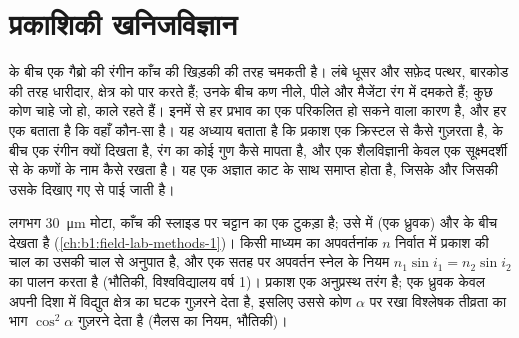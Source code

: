 \chapter{प्रकाशिकी खनिजविज्ञान}\label{ch:b1:optical-mineralogy}

 के बीच एक गैब्रो की  रंगीन काँच की खिड़की की तरह चमकती है। लंबे धूसर और सफ़ेद पत्थर, बारकोड
की तरह धारीदार, क्षेत्र को पार करते हैं; उनके बीच कण नीले, पीले और मैजेंटा रंग में दमकते हैं; कुछ कोण चाहे जो
हो, काले रहते हैं। इनमें से हर प्रभाव का एक परिकलित हो सकने वाला कारण है, और हर एक बताता है कि वहाँ कौन-सा
 है। यह अध्याय बताता है कि प्रकाश एक क्रिस्टल से कैसे गुज़रता है,  के बीच एक  रंगीन क्यों
दिखता है, रंग  का कोई गुण कैसे मापता है, और एक शैलविज्ञानी केवल एक सूक्ष्मदर्शी से  के कणों के नाम
कैसे रखता है। यह एक अज्ञात काट के साथ समाप्त होता है, जिसके  और जिसकी  उसके दिखाए गए से
पाई जाती है।

\begin{recall}
 लगभग \qty{30}{\micro m} मोटा, काँच की स्लाइड पर चट्टान का एक टुकड़ा है;  उसे  में (एक ध्रुवक) और  के बीच देखता है (\cref{ch:b1:field-lab-methods-1})। किसी माध्यम का
अपवर्तनांक $n$ निर्वात में प्रकाश की चाल का उसकी चाल से अनुपात है, और एक सतह पर अपवर्तन स्नेल के नियम
$n_1\sin i_1 = n_2\sin i_2$ का पालन करता है (भौतिकी, विश्वविद्यालय वर्ष 1)। प्रकाश एक अनुप्रस्थ तरंग है; एक ध्रुवक
केवल अपनी दिशा में विद्युत क्षेत्र का घटक गुज़रने देता है, इसलिए उससे कोण $\alpha$ पर रखा विश्लेषक तीव्रता का
भाग $\cos^2\alpha$ गुज़रने देता है (मैलस का नियम, भौतिकी)।
\end{recall}


